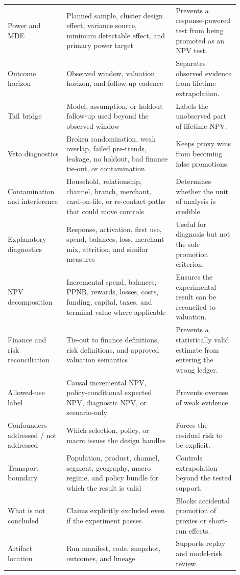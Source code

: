 \documentclass[11pt]{article}
\newcommand{\1}{\mathbf{1}}
\begin{document}
\begin{longtable}{L{0.22\linewidth}L{0.43\linewidth}L{0.25\linewidth}}
Power and MDE
  & Planned sample, cluster design effect, variance source, minimum detectable
    effect, and primary power target
  & Prevents a response-powered test from being promoted as an NPV test. \\
Outcome horizon
  & Observed window, valuation horizon, and follow-up cadence
  & Separates observed evidence from lifetime extrapolation. \\
Tail bridge
  & Model, assumption, or holdout follow-up used beyond the observed window
  & Labels the unobserved part of lifetime NPV. \\
Veto diagnostics
  & Broken randomization, weak overlap, failed pre-trends, leakage, no holdout,
    bad finance tie-out, or contamination
  & Keeps proxy wins from becoming false promotions. \\
Contamination and interference
  & Household, relationship, channel, branch, merchant, card-on-file, or
    re-contact paths that could move controls
  & Determines whether the unit of analysis is credible. \\
Explanatory diagnostics
  & Response, activation, first use, spend, balances, loss, merchant mix,
    attrition, and similar measures
  & Useful for diagnosis but not the sole promotion criterion. \\
NPV decomposition
  & Incremental spend, balances, PPNR, rewards, losses, costs, funding,
    capital, taxes, and terminal value where applicable
  & Ensures the experimental result can be reconciled to valuation. \\
Finance and risk reconciliation
  & Tie-out to finance definitions, risk definitions, and approved valuation
    semantics
  & Prevents a statistically valid estimate from entering the wrong ledger. \\
Allowed-use label
  & Causal incremental NPV, policy-conditional expected NPV, diagnostic NPV,
    or scenario-only
  & Prevents overuse of weak evidence. \\
Confounders addressed / not addressed
  & Which selection, policy, or macro issues the design handles
  & Forces the residual risk to be explicit. \\
Transport boundary
  & Population, product, channel, segment, geography, macro regime, and policy
    bundle for which the result is valid
  & Controls extrapolation beyond the tested support. \\
What is not concluded
  & Claims explicitly excluded even if the experiment passes
  & Blocks accidental promotion of proxies or short-run effects. \\
Artifact location
  & Run manifest, code, snapshot, outcomes, and lineage
  & Supports replay and model-risk review. \\
\bottomrule
\end{longtable}
\end{document}
